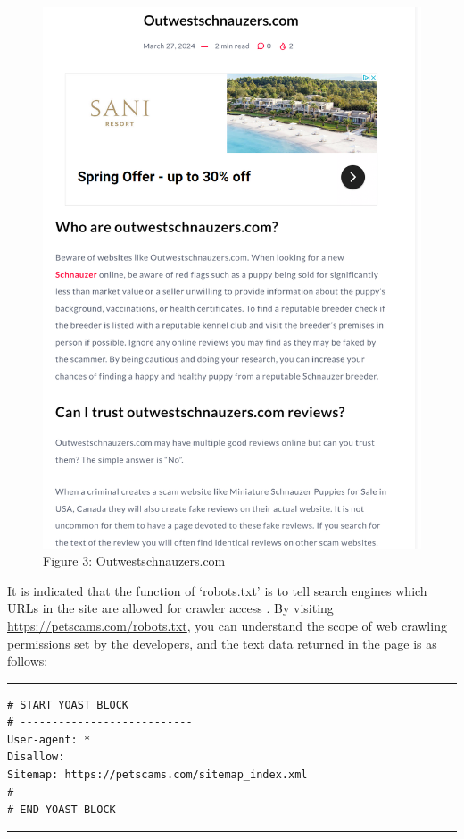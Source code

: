 \documentclass[ oneside,%
                    author={Cassie Qing Tang},
                    degree={BSc},
                     title={An Automated Response System for Disrupting Online Pet Scamming \\ },
                    subtitle={ }]{dissertation}
\begin{document}
\begin{figure}[H]
    \begin{minipage}{0.45\textwidth}\ContinuedFloat
        \includegraphics[width=\linewidth]{pic/figure3.png}
        \caption{Figure 3: Outwestschnauzers.com}
        \label{fig:pic3}
    \end{minipage}
\end{figure}


It is indicated that the function of ‘robots.txt’ is to tell search engines which URLs in the site are allowed for crawler access \cite{noauthor_robotstxt_nodate}. By visiting \url{https://petscams.com/robots.txt}, you can understand the scope of web crawling permissions set by the developers, and the text data returned in the page is as follows:
\vspace{10pt}
\noindent\hrule  
\begin{Verbatim}[fontsize=\small]
# START YOAST BLOCK
# ---------------------------
User-agent: *
Disallow:
Sitemap: https://petscams.com/sitemap_index.xml
# ---------------------------
# END YOAST BLOCK
\end{Verbatim}
\hrule  
\vspace{10pt}
\end{document}
